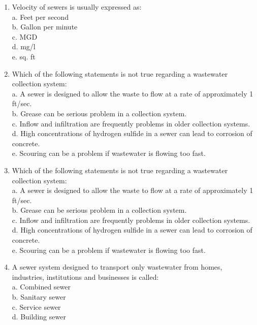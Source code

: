 \begin{tcolorbox}[breakable, enhanced,
colframe=blue!25,
colback=blue!10,
coltitle=blue!20!black,  
title= Chapter Assessment]
\begin{enumerate}
\item  Velocity of sewers is usually expressed as: \\

a. Feet per second \\
b. Gallon per minute \\
c. MGD \\
d. mg/l \\
e. sq. ft \\

\item  Which of the following statements is not true regarding a wastewater collection system: \\

a. A sewer is designed to allow the waste to flow at a rate of approximately 1 ft/sec. \\
b. Grease can be serious problem in a collection system. \\
c. Inflow and infiltration are frequently problems in older collection systems. \\
d. High concentrations of hydrogen sulfide in a sewer can lead to corrosion of concrete. \\
e. Scouring can be a problem if wastewater is flowing too fast. \\

\item  Which of the following statements is not true regarding a wastewater collection system: \\

a. A sewer is designed to allow the waste to flow at a rate of approximately 1 ft/sec. \\
b. Grease can be serious problem in a collection system. \\
c. Inflow and infiltration are frequently problems in older collection systems. \\
d. High concentrations of hydrogen sulfide in a sewer can lead to corrosion of concrete. \\
e. Scouring can be a problem if wastewater is flowing too fast. \\

\item  A sewer system designed to transport only wastewater from homes, industries, institutions and businesses is called: \\

a. Combined sewer \\
b. Sanitary sewer \\
c. Service sewer \\
d. Building sewer \\

\end{enumerate}
\end{tcolorbox}


